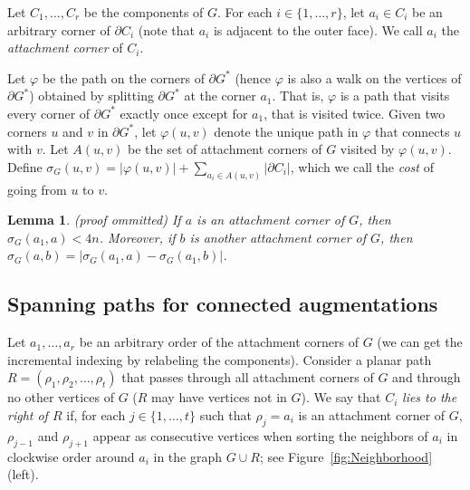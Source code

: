\documentclass{patmorin}
\newcommand{\appendixproof}{(proof ommitted)\xspace}
\newtheorem{lemma}[theorem]{Lemma}
\begin{document}
Let $C_1, \ldots, C_r$ be the components of $G$.
For each $i\in \{1,\dots,r\}$, let $a_i\in C_i$ be an arbitrary corner of $\partial C_i$ (note that $a_i$ is adjacent to the outer face).
We call $a_i$ the \emph{attachment corner} of $C_i$.

Let $\varphi$ be the path on the corners of $\partial G^*$ (hence $\varphi$ is also a walk on the vertices of $\partial G^*$) obtained by splitting $\partial G^*$ at the corner $a_1$. That is, $\varphi$ is a path that visits every corner of $\partial G^*$ exactly once except for $a_1$, that is visited twice.
Given two corners $u$ and $v$ in $\partial G^*$, let $\varphi(u,v)$ denote
the unique path in $\varphi$ that connects $u$ with $v$. Let $A(u,v)$ be
the set of attachment corners of $G$ visited by $\varphi(u,v)$. Define
    $ \sigma_G(u,v) = |\varphi(u,v)| + \sum_{a_i\in A(u,v)}|\partial C_i|$,
which we call the \emph{cost} of going from $u$ to $v$. 

\begin{lemma}\label{lemma:Contained in integer grid}\appendixproof
  If $a$ is an attachment corner of $G$, then $\sigma_G(a_1, a) < 4n$. Moreover, if $b$ is another attachment corner of $G$, then
  $\sigma_G(a, b) =  |\sigma_G(a_1, a)- \sigma_G(a_1, b)|$.
\end{lemma}
\subsection{Spanning paths for connected augmentations}\label{section:Spanning paths for connected augmentations}
Let $a_1, \ldots, a_r$ be an arbitrary order of the attachment corners of $G$ (we can get the incremental indexing by relabeling the components).
Consider a planar path $R = (\rho_1, \rho_2, \ldots, \rho_t)$ that passes through all attachment corners of $G$ and through no other vertices of $G$ ($R$ may have vertices not in $G$). We say that $C_i$ {\em lies to the right of $R$} if, for each $j\in\{1,\ldots,t\}$ such that $\rho_j=a_i$ is an attachment corner of $G$, $\rho_{j-1}$ and $\rho_{j+1}$ appear as consecutive vertices when sorting the neighbors of $a_i$ in clockwise order around $a_i$ in the graph $G\cup R$; see Figure~\ref{fig:Neighborhood} (left).
\end{document}
